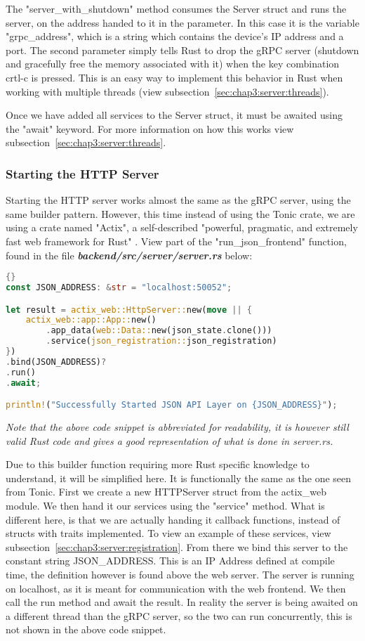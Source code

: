 The "server\_with\_shutdown" method consumes the Server struct and runs the server, on the address handed to it in the parameter. In this case it is the variable "grpc\_address", which is a string which contains the device's IP address and a port. The second parameter simply tells Rust to drop the gRPC server (shutdown and gracefully free the memory associated with it) when the key combination crtl-c is pressed. This is an easy way to implement this behavior in Rust when working with multiple threads (view subsection~\ref{sec:chap3:server:threads}).

Once we have added all services to the Server struct, it must be awaited using the "await" keyword. For more information on how this works view subsection~\ref{sec:chap3:server:threads}.  

\subsubsection{Starting the HTTP Server}
Starting the HTTP server works almost the same as the gRPC server, using the same builder pattern. However, this time instead of using the Tonic crate, we are using a crate named "Actix", a self-described "powerful, pragmatic, and extremely fast web framework for Rust" \cite{actixWebsite}. View part of the "run\_json\_frontend" function, found in the file \textbf{\textit{backend/src/server/server.rs}} below:
\begin{lstlisting}[language=Rust, style=boxed, showstringspaces=false]{}
const JSON_ADDRESS: &str = "localhost:50052";

let result = actix_web::HttpServer::new(move || {
    actix_web::app::App::new()
        .app_data(web::Data::new(json_state.clone()))
        .service(json_registration::json_registration)
})
.bind(JSON_ADDRESS)?
.run()
.await;

println!("Successfully Started JSON API Layer on {JSON_ADDRESS}");
\end{lstlisting}
\textit{Note that the above code snippet is abbreviated for readability, it is however still valid Rust code and gives a good representation of what is done in server.rs.} 

Due to this builder function requiring more Rust specific knowledge to understand, it will be simplified here. It is functionally the same as the one seen from Tonic. First we create a new HTTPServer struct from the actix\_web module. We then hand it our services using the "service" method. What is different here, is that we are actually handing it callback functions, instead of structs with traits implemented. To view an example of these services, view subsection~\ref{sec:chap3:server:registration}. From there we bind this server to the constant string JSON\_ADDRESS. This is an IP Address defined at compile time, the definition however is found above the web server. The server is running on localhost, as it is meant for communication with the web frontend. We then call the run method and await the result. In reality the server is being awaited on a different thread than the gRPC server, so the two can run concurrently, this is not shown in the above code snippet. 

